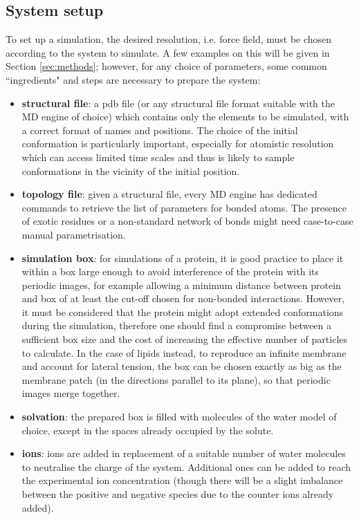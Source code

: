 \documentclass[graybox]{svmult}
\begin{document}
\subsection{System setup}
To set up a simulation, the desired resolution, i.e. force field, must be chosen according to the system to simulate. A few examples on this will be given in Section \ref{sec:methods}; however, for any choice of parameters, some common ``ingredients" and steps are necessary to prepare the system:
\begin{itemize}
\item \textbf{structural file}: a pdb file (or any structural file format suitable with the MD engine of choice) which contains only the elements to be simulated, with a correct format of names and positions. The choice of the initial conformation is particularly important, especially for atomistic resolution which can access limited time scales and thus is likely to sample conformations in the vicinity of the initial position.
\item \textbf{topology file}: given a structural file, every MD engine has dedicated commands to retrieve the list of parameters for bonded atoms. The presence of exotic residues or a non-standard network of bonds might need case-to-case manual parametrisation.
\item \textbf{simulation box}: for simulations of a protein, it is good practice to place it within a box large enough to avoid interference of the protein with its periodic images, for example allowing a minimum distance between protein and box of at least the cut-off chosen for non-bonded interactions. However, it must be considered that the protein might adopt extended conformations during the simulation, therefore one should find a compromise between a sufficient box size and the cost of increasing the effective number of particles to calculate.
%
In the case of lipids instead, to reproduce an infinite membrane and account for lateral tension, the box can be chosen exactly as big as the membrane patch (in the directions parallel to its plane), so that periodic images merge together.
\item \textbf{solvation}: the prepared box is filled with molecules of the water model of choice, except in the spaces already occupied by the solute.
\item \textbf{ions}: ions are added in replacement of a suitable number of water molecules to neutralise the charge of the system. Additional ones can be added to reach the experimental ion concentration (though there will be a slight imbalance between the positive and negative species due to the counter ions already added).

\end{itemize}
\end{document}

